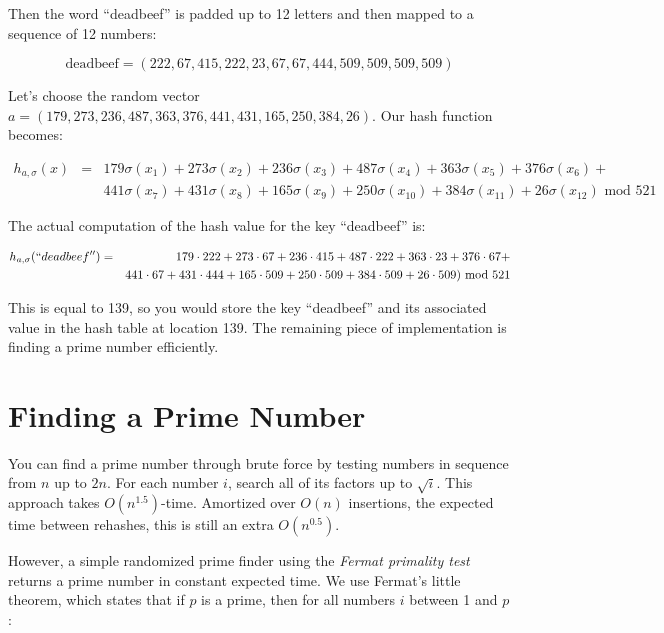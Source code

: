 \documentclass{article}[10pth]
\begin{document}
Then the word ``deadbeef'' is padded up to 12 letters and then mapped to
a sequence of 12 numbers:

\begin{equation}
\textrm{deadbeef} = (222, 67, 415, 222, 23, 67, 67, 444, 509, 509, 509, 509)
\end{equation}

Let's choose the random vector
$a = (179, 273, 236, 487, 363, 376, 441, 431, 165, 250, 384, 26)$.
Our hash function becomes:

\begin{eqnarray}
h_{a,\sigma}(x) & = & 179\sigma(x_1) + 273\sigma(x_2) + 236\sigma(x_3) + 487\sigma(x_4) + 363\sigma(x_5) + 376\sigma(x_6) + \\
& & 441\sigma(x_7) +  431\sigma(x_8) + 165\sigma(x_9) + 250\sigma(x_{10}) + 384\sigma(x_{11}) + 26\sigma(x_{12}) \textrm{ mod } 521
\end{eqnarray}

The actual computation of the hash value for the key ``deadbeef'' is:

\begin{eqnarray}
h_{a,\sigma}(``deadbeef'') & = & 179\cdot 222 + 273\cdot 67 + 236\cdot 415 + 487\cdot 222 + 363\cdot 23 + 376\cdot 67 +\\
& & 441\cdot 67 +  431\cdot 444 + 165\cdot 509 + 250\cdot 509 + 384\cdot 509 + 26\cdot 509)\textrm{ mod } 521
\end{eqnarray}

This is equal to 139, so you would store the key ``deadbeef'' and its
associated value in the hash table at location 139.
The remaining piece of implementation is finding a prime number efficiently.

\section{Finding a Prime Number}

You can find a prime number through brute force by testing numbers in
sequence from $n$ up to $2n$. For each number $i$, search all of its
factors up to $\sqrt{i}$. This approach takes $O(n^{1.5})$-time.
Amortized over $O(n)$ insertions, the expected time between rehashes,
this is still an extra $O(n^{0.5})$.

However, a simple randomized prime finder using the \textit{Fermat
primality test} returns a prime number in constant expected time.
We use Fermat's little theorem, which states
that if $p$ is a prime, then for all numbers $i$ between 1
and $p$:
\end{document}
